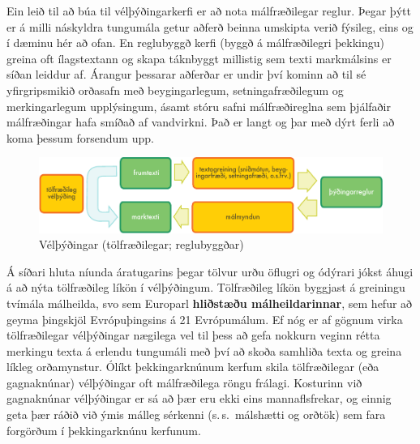 \begin{multicols}{2}
Ein leið til að búa til vélþýðingarkerfi er að nota málfræðilegar reglur. Þegar þýtt er á milli náskyldra tungumála getur aðferð beinna umskipta verið fýsileg, eins og í dæminu hér að ofan. En reglubyggð kerfi (byggð á málfræðilegri þekkingu) greina oft ílagstextann og skapa táknbyggt millistig sem texti markmálsins er síðan leiddur af. Árangur þessarar aðferðar er undir því kominn að til sé yfirgripsmikið orðasafn með beygingarlegum, setningafræðilegum og merkingarlegum upplýsingum, ásamt stóru safni málfræðireglna sem þjálfaðir málfræðingar hafa smíðað af vandvirkni. Það er langt og þar með dýrt ferli að koma þessum forsendum upp.

\begin{figure}[htb]
  \center
  \includegraphics[width=\textwidth]{../_media/icelandic/machine_translation}
  \caption{Vélþýðingar (tölfræðilegar; reglubyggðar)}
  \label{fig:mtarch_is}
\end{figure}

Á síðari hluta níunda áratugarins þegar tölvur urðu öflugri og ódýrari jókst áhugi á að nýta tölfræðileg líkön í vélþýðingum. Tölfræðileg líkön byggjast á greiningu tvímála málheilda, svo sem Europarl \textbf{hliðstæðu málheildarinnar}, sem hefur að geyma þingskjöl Evrópuþingsins á 21 Evrópumálum. Ef nóg er af gögnum virka tölfræðilegar vélþýðingar nægilega vel til þess að gefa nokkurn veginn rétta merkingu texta á erlendu tungumáli með því að skoða samhliða texta og greina líkleg orðamynstur. Ólíkt þekkingarknúnum kerfum skila tölfræðilegar (eða gagnaknúnar) vélþýðingar oft málfræðilega röngu frálagi. Kosturinn við gagnaknúnar vélþýðingar er sá að þær eru ekki eins mannaflsfrekar, og einnig geta þær ráðið við ýmis málleg sérkenni (s.\,s.~málshætti og orðtök) sem fara forgörðum í þekkingarknúnu kerfunum.


\end{multicols}
